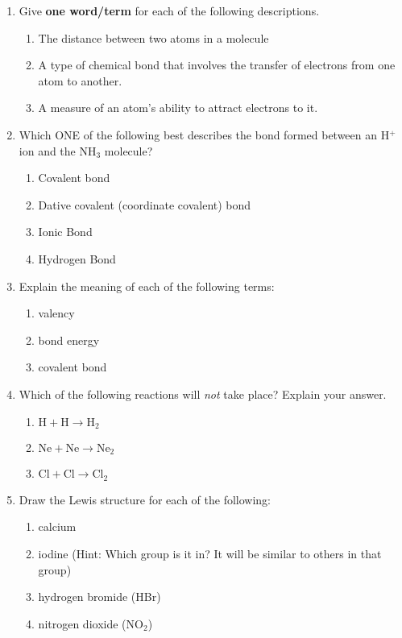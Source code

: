 \begin{eocexercises}{}

\begin{enumerate}

\item{Give \textbf{one word/term} for each of the following descriptions.}
\begin{enumerate}
\item{The distance between two atoms in a molecule}
\item{A type of chemical bond that involves the transfer of electrons from one atom to another.}
\item{A measure of an atom's ability to attract electrons to it.}
\end{enumerate}

\item{Which ONE of the following best describes the bond formed between an H$^+$ ion and the NH$_3$ molecule?}
\begin{enumerate}
\item{Covalent bond}
\item{Dative covalent (coordinate covalent) bond}
\item{Ionic Bond}
\item{Hydrogen Bond}
\end{enumerate}

\item{Explain the meaning of each of the following terms:}
\begin{enumerate}
\item{valency}
\item{bond energy}
\item{covalent bond}
\end{enumerate}

\item{Which of the following reactions will \textit{not} take place? Explain your answer.}
\begin{enumerate}
\item{$\text{H} + \text{H} \rightarrow \text{H}_{2}$}
\item{$\text{Ne} + \text{Ne} \rightarrow \text{Ne}_{2}$}
\item{$\text{Cl} + \text{Cl} \rightarrow \text{Cl}_{2}$}
\end{enumerate}

\item{Draw the Lewis structure for each of the following:}
\begin{enumerate}
\item{calcium}
\item{iodine (Hint: Which group is it in? It will be similar to others in that group)}
\item{hydrogen bromide (HBr)}
\item{nitrogen dioxide (NO$_{2}$)}
\end{enumerate}


\end{enumerate}
\end{eocexercises}
